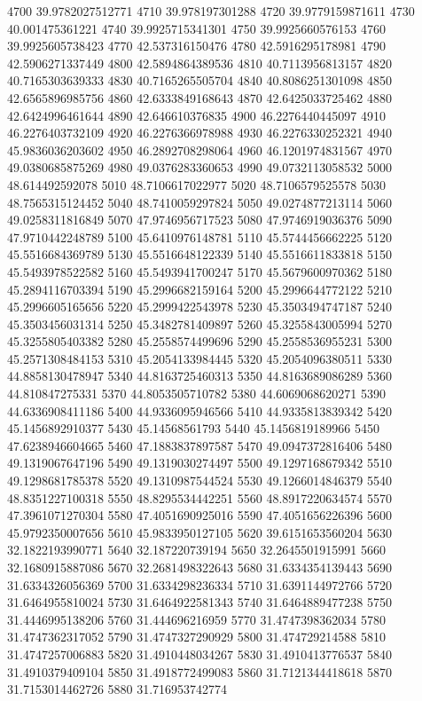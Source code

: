 {4700 39.9782027512771
4710 39.978197301288
4720 39.9779159871611
4730 40.001475361221
4740 39.9925715341301
4750 39.9925660576153
4760 39.9925605738423
4770 42.537316150476
4780 42.5916295178981
4790 42.5906271337449
4800 42.5894864389536
4810 40.7113956813157
4820 40.7165303639333
4830 40.7165265505704
4840 40.8086251301098
4850 42.6565896985756
4860 42.6333849168643
4870 42.6425033725462
4880 42.6424996461644
4890 42.646610376835
4900 46.2276440445097
4910 46.2276403732109
4920 46.2276366978988
4930 46.2276330252321
4940 45.9836036203602
4950 46.2892708298064
4960 46.1201974831567
4970 49.0380685875269
4980 49.0376283360653
4990 49.0732113058532
5000 48.614492592078
5010 48.7106617022977
5020 48.7106579525578
5030 48.7565315124452
5040 48.7410059297824
5050 49.0274877213114
5060 49.0258311816849
5070 47.9746956717523
5080 47.9746919036376
5090 47.9710442248789
5100 45.6410976148781
5110 45.5744456662225
5120 45.5516684369789
5130 45.5516648122339
5140 45.5516611833818
5150 45.5493978522582
5160 45.5493941700247
5170 45.5679600970362
5180 45.2894116703394
5190 45.2996682159164
5200 45.2996644772122
5210 45.2996605165656
5220 45.2999422543978
5230 45.3503494747187
5240 45.3503456031314
5250 45.3482781409897
5260 45.3255843005994
5270 45.3255805403382
5280 45.2558574499696
5290 45.2558536955231
5300 45.2571308484153
5310 45.2054133984445
5320 45.2054096380511
5330 44.8858130478947
5340 44.8163725460313
5350 44.8163689086289
5360 44.810847275331
5370 44.8053505710782
5380 44.6069068620271
5390 44.6336908411186
5400 44.9336095946566
5410 44.9335813839342
5420 45.1456892910377
5430 45.14568561793
5440 45.1456819189966
5450 47.6238946604665
5460 47.1883837897587
5470 49.0947372816406
5480 49.1319067647196
5490 49.1319030274497
5500 49.1297168679342
5510 49.1298681785378
5520 49.1310987544524
5530 49.1266014846379
5540 48.8351227100318
5550 48.8295534442251
5560 48.8917220634574
5570 47.3961071270304
5580 47.4051690925016
5590 47.4051656226396
5600 45.9792350007656
5610 45.9833950127105
5620 39.6151653560204
5630 32.1822193990771
5640 32.187220739194
5650 32.2645501915991
5660 32.1680915887086
5670 32.2681498322643
5680 31.6334354139443
5690 31.6334326056369
5700 31.6334298236334
5710 31.6391144972766
5720 31.6464955810024
5730 31.6464922581343
5740 31.6464889477238
5750 31.4446995138206
5760 31.444696216959
5770 31.4747398362034
5780 31.4747362317052
5790 31.4747327290929
5800 31.474729214588
5810 31.4747257006883
5820 31.4910448034267
5830 31.4910413776537
5840 31.4910379409104
5850 31.4918772499083
5860 31.7121344418618
5870 31.7153014462726
5880 31.716953742774
}
